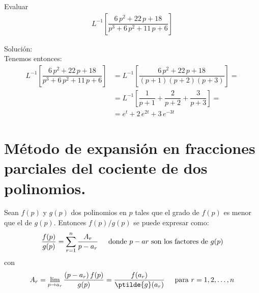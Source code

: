 \begin{ejemplo} Evaluar
\begin{align*}
L^{-1} \left[ \dfrac{6 \, p^{2} + 22 \, p + 18}{p^{3} + 6 \, p^{2} + 11 \, p + 6} \right]
\end{align*}

\noindent Solución:
\\[0.5em]
Tenemos entonces:
\begin{align*}
L^{-1} \left[ \dfrac{6 \, p^{2} + 22 \, p + 18}{p^{3} + 6 \, p^{2} + 11 \, p + 6} \right] &= L^{-1} \left[ \dfrac{6 \, p^{2} + 22 \, p + 18}{(p + 1)(p + 2)(p + 3)} \right] = \\[0.5em]
&= L^{-1} \left[ \dfrac{1}{p + 1} + \dfrac{2}{p + 2} + \dfrac{3}{p + 3} \right] = \\[0.5em]
&= e^{t} + 2 \, e^{2 t} + 3 \, e^{- 3 t}
\end{align*}
\end{ejemplo}

\section{Método de expansión en fracciones parciales del cociente de dos polinomios.}

Sean $f (p)$ y $g (p)$ dos polinomios en $p$ tales que el grado de $f (p)$ es menor que el de $g (p)$. Entonces $f (p) / g (p)$ se puede expresar como:
\begin{align*}
\dfrac{f(p)}{g(p)} = \sum_{r=1}^{n} \dfrac{A_{r}}{p - a_{r}} \hspace{0.5cm} \mbox{donde } p - a{r} \mbox{ son los factores de } g(p)
\end{align*}
con
\begin{align*}
A_{r} = \lim_{p \to a_{r}} \dfrac{(p - a_{r}) \, f(p)}{g(p)} = \dfrac{f(a_{r})}{\ptilde{g}(a_{r})} \hspace{0.5cm} \mbox{para  } r = 1, 2, \ldots, n
\end{align*}

